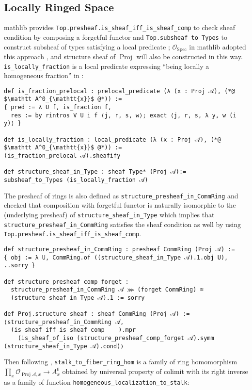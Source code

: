 \documentclass[a4paper,UKenglish,cleveref, autoref, thm-restate]{lipics-v2021}
\begin{document}
\subsection{Locally Ringed Space}
\textsf{mathlib} provides \lstinline{Top.presheaf.is_sheaf_iff_is_sheaf_comp} to check sheaf condition by composing a forgetful functor and \lstinline{Top.subsheaf_to_Types} to construct subsheaf of types satisfying a local predicate \cite{docsmathlib}; $\mathcal{O}_{\operatorname{Spec}}$ in \textsf{mathlib} adopted this approach \cite{mathlibrepo}, and structure sheaf of $\operatorname{Proj}$ will also be constructed in this way. \lstinline{is_locally_fraction} is a local predicate expressing ``being locally a homogeneous fraction'' in :

\begin{lstlisting}
def is_fraction_prelocal : prelocal_predicate (λ (x : Proj 𝒜), (*@ $\mathtt A^0_{\mathtt{x}}$ @*)) :=
{ pred := λ U f, is_fraction f,
  res := by rintros V U i f ⟨j, r, s, w⟩; exact ⟨j, r, s, λ y, w (i y)⟩ }

def is_locally_fraction : local_predicate (λ (x : Proj 𝒜), (*@ $\mathtt A^0_{\mathtt{x}}$ @*)) :=
(is_fraction_prelocal 𝒜).sheafify

def structure_sheaf_in_Type : sheaf Type* (Proj 𝒜):=
subsheaf_to_Types (is_locally_fraction 𝒜)
\end{lstlisting}

The presheaf of rings is also defined as \lstinline{structure_presheaf_in_CommRing} and checked that composition with forgetful functor is naturally isomorphic to the (underlying presheaf) of \lstinline{structure_sheaf_in_Type} which implies that \lstinline{structure_presheaf_in_CommRing} satisfies the sheaf condition as well by using \lstinline{Top.presheaf.is_sheaf_iff_is_sheaf_comp}.
\begin{lstlisting}
def structure_presheaf_in_CommRing : presheaf CommRing (Proj 𝒜) :=
{ obj := λ U, CommRing.of ((structure_sheaf_in_Type 𝒜).1.obj U), ..sorry }

def structure_presheaf_comp_forget :
  structure_presheaf_in_CommRing 𝒜 ⋙ (forget CommRing) ≅ 
  (structure_sheaf_in_Type 𝒜).1 := sorry

def Proj.structure_sheaf : sheaf CommRing (Proj 𝒜) :=
⟨structure_presheaf_in_CommRing 𝒜,
  (is_sheaf_iff_is_sheaf_comp _ _).mpr
    (is_sheaf_of_iso (structure_presheaf_comp_forget 𝒜).symm (structure_sheaf_in_Type 𝒜).cond)⟩
\end{lstlisting}
Then following , \lstinline{stalk_to_fiber_ring_hom} is a family of ring homomorphism $\prod_x \mathcal{O}_{\operatorname{Proj}\mathcal A, x}\to A^0_x$ obtained by universal property of colimit with its right inverse as a family of function \lstinline{homogeneous_localization_to_stalk}:
\end{document}

